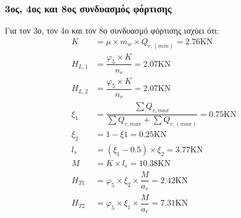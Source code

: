 \subsubsection{3ος, 4ος και 8ος συνδυασμός φόρτισης}
Για τον 3ο, τον 4ο και τον 8ο συνδυασμό φόρτισης ισχύει ότι:
\begin{align*}
K         &= μ \times m_w \times Q_{r,(min)}  =   2.76 \text{KN} \\ 
H_{L,1}   &= \dfrac{φ_5 \times K} {n_r} =   2.07 \text{KN} \\ 
H_{L,2}   &= \dfrac{φ_5 \times K} {n_r} =   2.07 \text{KN} \\ 
ξ_1       &= \dfrac{\displaystyle\sum{Q_{r,max}}}{\displaystyle\sum{Q_{r,max} + \displaystyle\sum{Q_{r,(max)}}}} =   0.75 \text{KN} \\ 
ξ_2       &= 1 - ξ1 =   0.25 \text{KN} \\ 
l_s       &= (ξ_1 - 0.5) \times ξ_2 =   3.77 \text{KN} \\ 
M         &= K \times l_s =  10.38 \text{KN} \\ 
H_{T1}    &= φ_5 \times ξ_2 \times \dfrac{M}{a_r} =   2.42 \text{KN} \\ 
H_{T2}    &= φ_5 \times ξ_1 \times \dfrac{M}{a_r} =   7.31 \text{KN} 
\end{align*}



